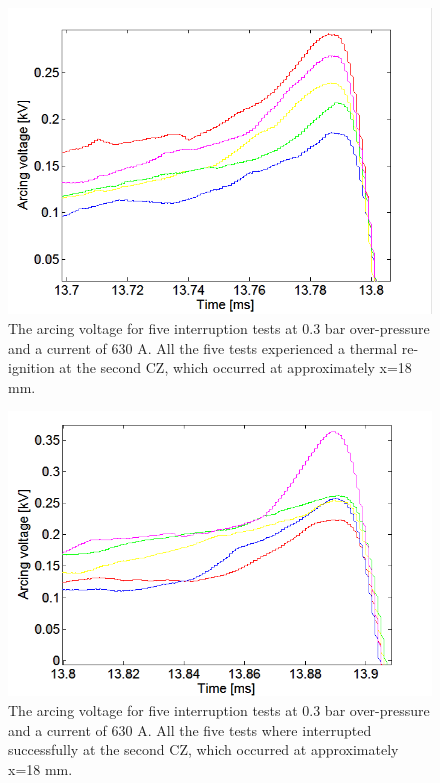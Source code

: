 \documentclass[10pt,b5paper,twoside]{article}
\begin{document}
\begin{figure}[H]
\centering
\includegraphics[scale=0.6, angle =0 ]{Bilder/Results/ArcingVoltage_18_reIgnition.PNG}
\caption{The arcing voltage for five interruption tests at 0.3 bar over-pressure and a current of 630 A. All the five tests experienced a thermal re-ignition at the second CZ, which occurred at approximately  x=18 mm.} \label{fig:18mmUnSuccessful}
\end{figure}

\begin{figure}[H]
\centering
\includegraphics[scale=0.6, angle =0 ]{Bilder/Results/ArcingVoltage_18_none_reIgnition.PNG}
\caption{The arcing voltage for five interruption tests at 0.3 bar over-pressure and a current of 630 A. All the five tests where interrupted successfully at the second CZ, which occurred at approximately  x=18 mm.} \label{fig:18mmSuccessful}
\end{figure}
\end{document}
